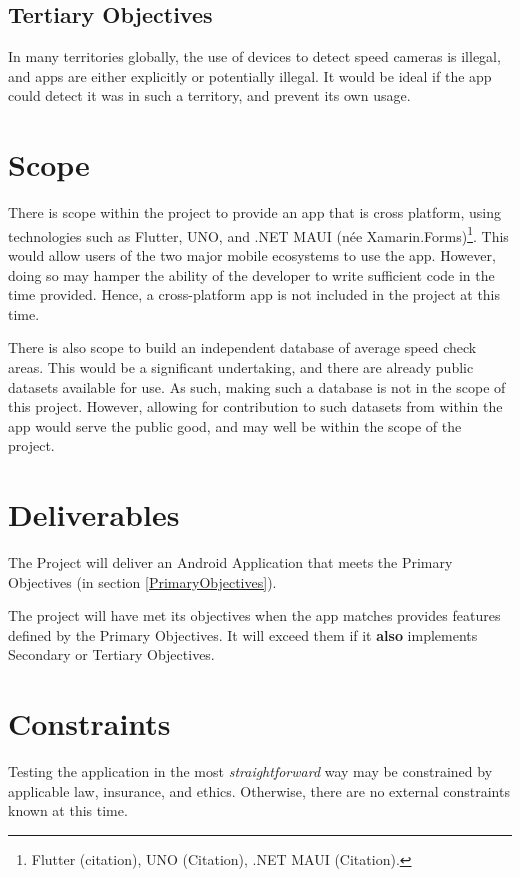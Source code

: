 \documentclass[11pt, a4paper, notitlepage]{report}
\begin{document}
\subsection{Tertiary Objectives}
In many territories globally, the use of devices to detect speed cameras is 
illegal, and apps are either explicitly or potentially illegal. It would be 
ideal if the app could detect it was in such a territory, and prevent its own 
usage.

\section{Scope}
There is scope within the project to provide an app that is cross platform, 
using technologies such as Flutter, UNO, and .NET MAUI (née 
Xamarin.Forms)\footnote{Flutter (citation), UNO (Citation), .NET MAUI 
(Citation).}. This would allow users of the two major mobile ecosystems to use 
the app. However, doing so may hamper the ability of the developer to write 
sufficient code in the time provided. Hence, a cross-platform app is not 
included in the project at this time.

There is also scope to build an independent database of average speed check 
areas. This would be a significant undertaking, and there are already public 
datasets available for use. As such, making such a database is not in the scope 
of this project. However, allowing for contribution to such datasets from 
within the app would serve the public good, and may well be within the scope of 
the project.

\section{Deliverables}
The Project will deliver an Android Application that meets the Primary 
Objectives (in section \ref{PrimaryObjectives}).

The project will have met its objectives when the app matches provides features 
defined by the Primary Objectives. It will exceed them if it \textbf{also} 
implements Secondary or Tertiary Objectives.

\section{Constraints}
Testing the application in the most \textit{straightforward} way may be 
constrained by applicable law, insurance, and ethics. Otherwise, there are no 
external constraints known at this time.
\end{document}
